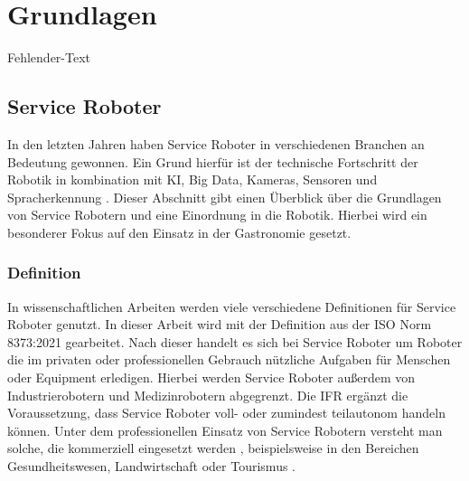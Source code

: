 \newpage
\section{Grundlagen} \label{Grundlagen}
Fehlender-Text

\subsection{Service Roboter}
In den letzten Jahren haben Service Roboter in verschiedenen Branchen an Bedeutung gewonnen. Ein Grund hierfür ist der technische Fortschritt der Robotik in kombination mit KI, Big Data, Kameras, Sensoren und Spracherkennung \cite[S.~424]{Paluch2020}. Dieser Abschnitt gibt einen Überblick über die Grundlagen von Service Robotern und eine Einordnung in die Robotik. Hierbei wird ein besonderer Fokus auf den Einsatz in der Gastronomie gesetzt.

\subsubsection{Definition}
In wissenschaftlichen Arbeiten werden viele verschiedene Definitionen für Service Roboter genutzt. In dieser Arbeit wird mit der Definition aus der ISO Norm 8373:2021 \cite[Kap.~3]{ISO2021} gearbeitet. Nach dieser handelt es sich bei Service Roboter um Roboter die im privaten oder professionellen Gebrauch nützliche Aufgaben für Menschen oder Equipment erledigen. Hierbei werden Service Roboter außerdem von Industrierobotern und Medizinrobotern abgegrenzt. Die \ac{IFR} \cite{IFR2024} ergänzt die Voraussetzung, dass Service Roboter voll- oder zumindest teilautonom handeln können. Unter dem professionellen Einsatz von Service Robotern versteht man solche, die kommerziell eingesetzt werden \cite[S.~4]{GonzalezAguirre2021}, beispielsweise in den Bereichen Gesundheitswesen, Landwirtschaft oder Tourismus \cite[S.~9]{GonzalezAguirre2021}.

